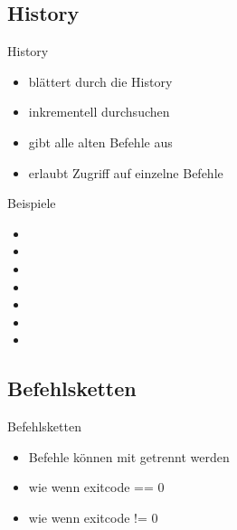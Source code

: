 \documentclass[aspectratio=43]{beamer}
\begin{document}
\subsection{History}
\begin{frame} 

	\begin{block}{History} 
	\begin{itemize}
	\item \taste{$\;\uparrow\;$} \taste{$\;\downarrow\;$}  blättert durch die History
	\item {} inkrementell durchsuchen
	\item {} gibt alle alten Befehle aus
	\item \co{!} erlaubt Zugriff auf einzelne Befehle 
	\end{itemize}
	\end{block}

\end{frame}

\begin{frame} 

	\begin{exampleblock}{Beispiele} 
	\begin{itemize}
	\item \co{!!}
	\item {}
	\item {}
	\item {}
	\item {}
	\item {}
	\item {}
	\end{itemize}
	\end{exampleblock}

\end{frame}

\subsection{Befehlsketten}
\begin{frame} 

	\begin{block}{Befehlsketten} 
	\begin{itemize}
	\item Befehle können mit \co{;} getrennt werden
	\item \co{\&\&} wie \co{;} wenn exitcode == 0
	\item \co{||} wie \co{;} wenn exitcode != 0
	\end{itemize}
	\end{block}

\end{frame}
\end{document}
